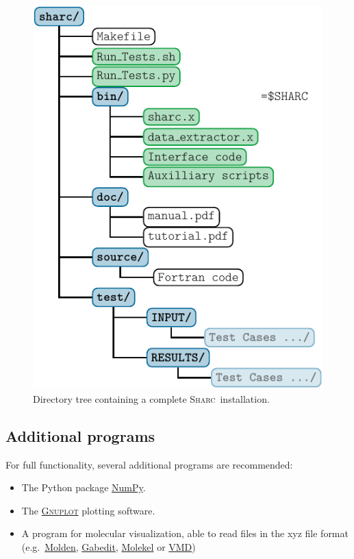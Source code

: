 \documentclass[a4paper,11pt,DIV=15,openany,twoside=false]{scrbook}
\newcommand{\sharc}{\textsc{Sharc}}
\begin{document}
\begin{figure}[h!]
  \centering
  \includegraphics[scale=1]{img/dirs_SHARC/dirs_SHARC.pdf}
  \caption{Directory tree containing a complete \sharc\ installation.}
  \label{fig:installation}
\end{figure}

\subsection{Additional programs}

For full functionality, several additional programs are recommended:
\begin{itemize}
  \item The Python package \href{http://www.numpy.org/}{NumPy}.
  \item The \href{http://www.gnuplot.info/}{\textsc{Gnuplot}} plotting software.
  \item A program for molecular visualization, able to read files in the xyz file format (e.g.\ \href{http://www.cmbi.ru.nl/molden/molden.html}{Molden}, \href{http://gabedit.sourceforge.net/}{Gabedit}, \href{http://molekel.cscs.ch/wiki/pmwiki.php}{Molekel} or \href{http://www.ks.uiuc.edu/Research/vmd/}{VMD})
\end{itemize}
\end{document}
